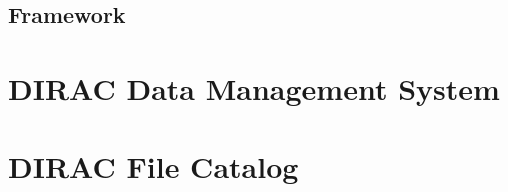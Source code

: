 \subsection{Framework}
\cite{DISET}

\section{DIRAC Data Management System}


\section{DIRAC File Catalog}

